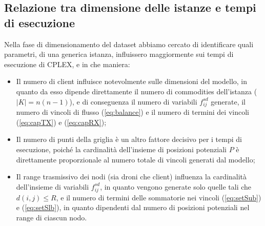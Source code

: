\subsection{Relazione tra dimensione delle istanze e tempi di esecuzione}
Nella fase di dimensionamento del dataset abbiamo cercato di identificare quali parametri, di una generica istanza, influissero maggiormente sui tempi di esecuzione di CPLEX, e in che maniera:
\begin{itemize}
	\item Il numero di client influisce notevolmente sulle dimensioni del modello, in quanto da esso dipende direttamente il numero di commodities dell'istanza ($|K| = n(n-1)$), e di conseguenza il numero di variabili $f_{ij}^{sd}$ generate, il numero di vincoli di flusso (\ref{eq:balance}) e il numero di termini dei vincoli (\ref{eq:capTX}) e (\ref{eq:capRX}); 
	\item Il numero di punti della griglia è un altro fattore decisivo per i tempi di esecuzione, poiché la cardinalità dell'insieme di posizioni potenziali $P$ è direttamente proporzionale al numero totale di vincoli generati dal modello;
	\item Il range trasmissivo dei nodi (sia droni che client) influenza la cardinalità dell'insieme di variabili $f_{ij}^{sd}$, in quanto vengono generate solo quelle tali che $d(i,j) \leq R$, e il numero di termini delle sommatorie nei vincoli (\ref{eq:setSub}) e (\ref{eq:setSlb}), in quanto dipendenti dal numero di posizioni potenziali nel range di ciascun nodo. 
\end{itemize} 

